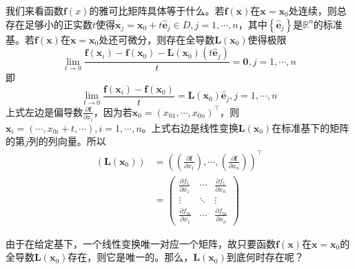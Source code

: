 \documentclass[main.tex]{subfiles}
\begin{document}
我们来看函数$\mathbf{f}\left(x\right)$的雅可比矩阵具体等于什么。若$\mathbf{f}\left(\mathbf{x}\right)$在$\mathbf{x}=\mathbf{x}_0$处连续，则总存在足够小的正实数$t$使得$\mathbf{x}_j=\mathbf{x}_0+t\mathbf{\hat{e}}_j\in D,j=1,\cdots,n$，其中$\left\{\mathbf{\hat{e}}_j\right\}$是$\mathbb{R}^n$的标准基。若$\mathbf{f}\left(\mathbf{x}\right)$在$\mathbf{x}=\mathbf{x}_0$处还可微分，则存在全导数$\mathbf{L}\left(\mathbf{x}_0\right)$使得极限
\[\lim_{t\to 0}\frac{\mathbf{f}\left(\mathbf{x}_i\right)-\mathbf{f}\left(\mathbf{x}_0\right)-\mathbf{L}\left(\mathbf{x}_0\right)\left(t\mathbf{\hat{e}}_j\right)}{t}=\mathbf{0},j=1,\cdots,n
\]
即
\[
\lim_{t\to 0}\frac{\mathbf{f}\left(\mathbf{x}_i\right)-\mathbf{f}\left(\mathbf{x}_0\right)}{t}=\mathbf{L}\left(\mathbf{x}_0\right)\mathbf{\hat{e}}_j,j=1,\cdots,n
\]
上式左边是偏导数$\frac{\partial\mathbf{f}}{\partial x_i}$，因为若$\mathbf{x}_0=\left(x_{01},\cdots,x_{0n}\right)^\intercal$，则$\mathbf{x}_i=\left(\cdots,x_{0i}+t,\cdots\right),i=1,\cdots,n$。上式右边是线性变换$\mathbf{L}\left(\mathbf{x}_0\right)$在标准基下的矩阵的第$j$列的列向量。所以
\begin{align*}
    \left(\mathbf{L}\left(\mathbf{x}_0\right)\right)&=\left(\left(\frac{\partial\mathbf{f}}{\partial x_1}\right),\cdots,\left(\frac{\partial\mathbf{f}}{\partial x_n}\right)\right)^\intercal\\
    &=\left(\begin{array}{ccc}
    \frac{\partial f_1}{\partial x_1}&\cdots&\frac{\partial f_1}{\partial x_n}\\
    \vdots&\ddots&\vdots\\
    \frac{\partial f_m}{\partial x_1}&\cdots&\frac{\partial f_m}{\partial x_n}
    \end{array}\right)
\end{align*}

由于在给定基下，一个线性变换唯一对应一个矩阵，故只要函数$\mathbf{f}\left(\mathbf{x}\right)$在$\mathbf{x}=\mathbf{x}_0$的全导数$\mathbf{L}\left(\mathbf{x}_0\right)$存在，则它是唯一的。那么，$\mathbf{L}\left(\mathbf{x}_0\right)$到底何时存在呢？
\end{document}
